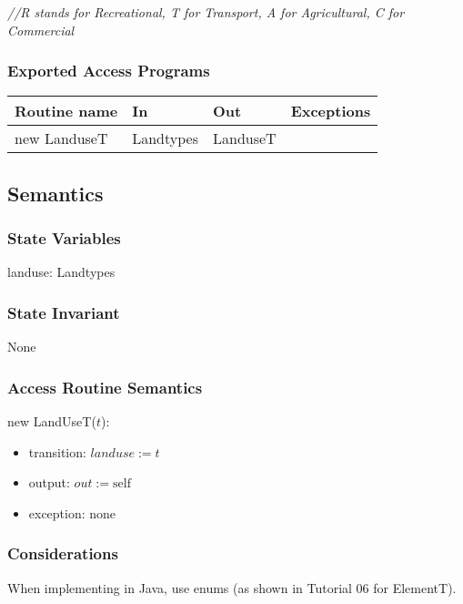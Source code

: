 \documentclass[12pt]{article}
\begin{document}
\noindent \textit{//R stands for Recreational, T for Transport, A for Agricultural, C for
  Commercial}

\subsubsection* {Exported Access Programs}

\begin{tabular}{| l | l | l | p{5cm} |}
\hline
\textbf{Routine name} & \textbf{In} & \textbf{Out} & \textbf{Exceptions}\\
\hline
new LanduseT & Landtypes & LanduseT & ~\\
\hline
\end{tabular}

\subsection* {Semantics}

\subsubsection* {State Variables}

landuse: Landtypes

\subsubsection* {State Invariant}

None

\subsubsection* {Access Routine Semantics}

\noindent new LandUseT($t$):
\begin{itemize}
\item transition: $\mathit{landuse} := t$
\item output: $out := \mbox{self}$
\item exception: none
\end{itemize}

\subsubsection* {Considerations}

When implementing in Java, use enums (as shown in Tutorial 06 for ElementT).

\newpage
\end{document}
